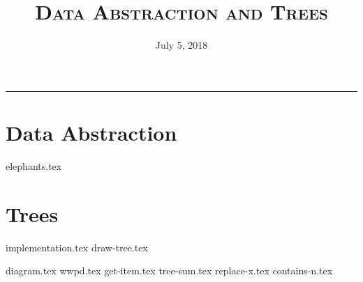 \documentclass{exam}
\title{\textsc{Data Abstraction and Trees}}
\date{July 5, 2018}
\begin{document}
\maketitle
\rule{\textwidth}{0.15em}
\fontsize{12}{15}\selectfont


\section{Data Abstraction}
\begin{questions}
{elephants.tex}
\end{questions}

\newpage
\section{Trees}
{implementation.tex}
\vspace{2\baselineskip}
{draw-tree.tex}
\newpage
\begin{questions}
{diagram.tex}
{wwpd.tex}
\vspace{2\baselineskip}
{get-item.tex}
{tree-sum.tex}
{replace-x.tex}
{contains-n.tex}

\end{questions}
\end{document}
